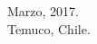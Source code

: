 



\vfill
\singlespacing
\begin{flushright}
	\noindent
   	Marzo, 2017. \\
	Temuco, Chile. 
\end{flushright}
    
